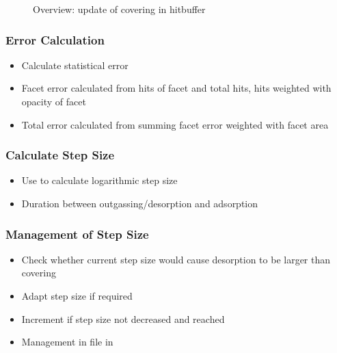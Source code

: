 \begin{figure}[!h]
\caption{Overview: update of covering in hitbuffer}
\end{figure}

\subsubsection{Error Calculation}
\begin{itemize}[noitemsep,topsep=0pt]
\item Calculate statistical error
\item Facet error calculated from hits of facet and total hits, hits weighted with opacity of facet
\item Total error calculated from summing facet error weighted with facet area
\end{itemize}

\subsubsection{Calculate Step Size}
\begin{itemize}[noitemsep,topsep=0pt]
\item Use  to calculate logarithmic step size
\item Duration between outgassing/desorption and adsorption
\end{itemize}

\subsubsection{Management of Step Size}
\begin{itemize}[noitemsep,topsep=0pt]
\item Check whether current step size would cause desorption to be larger than covering 
\item Adapt step size if required
\item Increment  if step size not decreased and  reached
\item Management in  file in 
\end{itemize}


